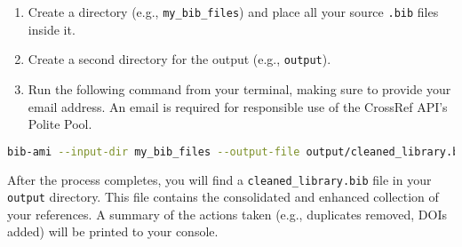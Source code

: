 \documentclass[11pt, a4paper]{article}
\begin{document}
\begin{enumerate}[leftmargin=*]
    \item Create a directory (e.g., \texttt{my\_bib\_files}) and place all your source \texttt{.bib} files inside it.
    \item Create a second directory for the output (e.g., \texttt{output}).
    \item Run the following command from your terminal, making sure to provide your email address. An email is required for responsible use of the CrossRef API's Polite Pool.
\end{enumerate}

\begin{lstlisting}[language=bash, caption={A typical command to clean a bibliography}]
bib-ami --input-dir my_bib_files --output-file output/cleaned_library.bib --email "your.name@university.edu"
\end{lstlisting}

After the process completes, you will find a \texttt{cleaned\_library.bib} file in your \texttt{output} directory. This file contains the consolidated and enhanced collection of your references. A summary of the actions taken (e.g., duplicates removed, DOIs added) will be printed to your console.
\end{document}
